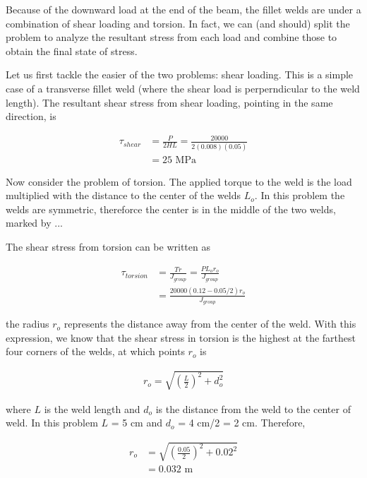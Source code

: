 \documentclass[
10pt,
a4paper,
openany,
svgnames,
]{book}
\begin{document}
\begin{solution}
  Because of the downward load at the end of the beam, the fillet welds are under a combination of shear loading and torsion. In fact, we can (and should) split the problem to analyze the resultant stress from each load and combine those to obtain the final state of stress.

  Let us first tackle the easier of the two problems: shear loading. This is a simple case of a transverse fillet weld (where the shear load is perperndicular to the weld length). The resultant shear stress from shear loading, pointing in the same direction, is
  
  \begin{align*}
    \tau_{shear} &= \frac{P}{2HL} = \frac{20000}{2(0.008)(0.05)} \\
                 &= 25 \text{ MPa}
  \end{align*}

  Now consider the problem of torsion. The applied torque to the weld is the load multiplied with the distance to the center of the welds $L_o$. In this problem the welds are symmetric, thereforce the center is in the middle of the two welds, marked by ...

  The shear stress from torsion can be written as

  \begin{align*}
    \tau_{torsion} &= \frac{Tr}{J_{group}} = \frac{P L_o r_o}{J_{group}} \\
                   &= \frac{20000(0.12-0.05/2) r_o}{J_{group}}
  \end{align*}

  the radius $r_o$ represents the distance away from the center of the weld. With this expression, we know that the shear stress in torsion is the highest at the farthest four corners of the welds, at which points $r_o$ is

  \begin{align*}
    r_o = \sqrt{ \left( \frac{L}{2} \right)^2 + d_o^2 }
  \end{align*}

  where $L$ is the weld length and $d_o$ is the distance from the weld to the center of weld. In this problem $L$ = 5 cm and $d_o$ = 4 cm/2 = 2 cm. Therefore,  

  \begin{align*}
     r_o &= \sqrt{ \left( \frac{0.05}{2} \right)^2 + 0.02^2 } \\
         &= 0.032 \text{ m}
   \end{align*}


\end{solution}
\end{document}
